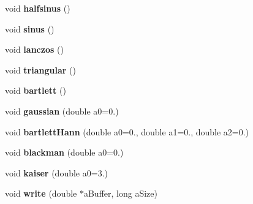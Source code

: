 \begin{DoxyCompactItemize}
\item 
\hypertarget{class_cicm_envelope_aeb2ac098933c26e0c857fd335b839140}{void {\bfseries halfsinus} ()}\label{class_cicm_envelope_aeb2ac098933c26e0c857fd335b839140}

\item 
\hypertarget{class_cicm_envelope_a85f21a9f0012e4ae27ef0ccef794dc04}{void {\bfseries sinus} ()}\label{class_cicm_envelope_a85f21a9f0012e4ae27ef0ccef794dc04}

\item 
\hypertarget{class_cicm_envelope_aa4f9f4b1c3683430aa710ca7abfa55c8}{void {\bfseries lanczos} ()}\label{class_cicm_envelope_aa4f9f4b1c3683430aa710ca7abfa55c8}

\item 
\hypertarget{class_cicm_envelope_a99ca6a92cef6c78ced4b732a7151a2da}{void {\bfseries triangular} ()}\label{class_cicm_envelope_a99ca6a92cef6c78ced4b732a7151a2da}

\item 
\hypertarget{class_cicm_envelope_aa2fc9d932a0cea72e4e85263f43b99d3}{void {\bfseries bartlett} ()}\label{class_cicm_envelope_aa2fc9d932a0cea72e4e85263f43b99d3}

\item 
\hypertarget{class_cicm_envelope_a879c5134fbabebc6335f558863b86c48}{void {\bfseries gaussian} (double a0=0.)}\label{class_cicm_envelope_a879c5134fbabebc6335f558863b86c48}

\item 
\hypertarget{class_cicm_envelope_af4059330ce46df825c732543c12e7b86}{void {\bfseries bartlett\-Hann} (double a0=0., double a1=0., double a2=0.)}\label{class_cicm_envelope_af4059330ce46df825c732543c12e7b86}

\item 
\hypertarget{class_cicm_envelope_a1a1aa883e6af18352d0f86235a9d3292}{void {\bfseries blackman} (double a0=0.)}\label{class_cicm_envelope_a1a1aa883e6af18352d0f86235a9d3292}

\item 
\hypertarget{class_cicm_envelope_a75af0b3bce78dffacb17bdae5e218ed0}{void {\bfseries kaiser} (double a0=3.)}\label{class_cicm_envelope_a75af0b3bce78dffacb17bdae5e218ed0}

\item 
\hypertarget{class_cicm_envelope_acc60dbaa093da94b265654851ab5c3ff}{void {\bfseries write} (double $\ast$a\-Buffer, long a\-Size)}\label{class_cicm_envelope_acc60dbaa093da94b265654851ab5c3ff}


\end{DoxyCompactItemize}
